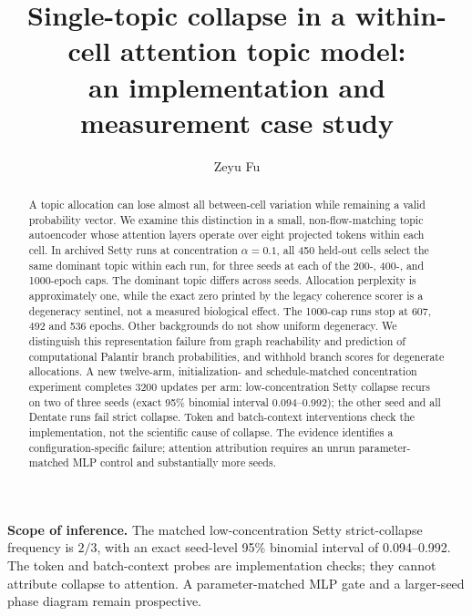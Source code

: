 \documentclass[11pt]{article}
\title{\textbf{Single-topic collapse in a within-cell attention topic model:\\ an implementation and measurement case study}}
\author[1]{Zeyu Fu}
\affil[1]{State Key Laboratory of Trauma and Chemical Poisoning, Institute of Combined Injury,
Chongqing Engineering Research Center for Nanomedicine, College of Preventive Medicine,
Army Medical University, Chongqing, China\\
\texttt{fuzeyu09@gmail.com}}
\date{}
\begin{document}
\maketitle


\begin{abstract}
A topic allocation can lose almost all between-cell variation while remaining a valid probability vector. We examine this distinction in a small, non-flow-matching topic autoencoder whose attention layers operate over eight projected tokens within each cell. In archived Setty runs at concentration $\alpha=0.1$, all 450 held-out cells select the same dominant topic within each run, for three seeds at each of the 200-, 400-, and 1000-epoch caps. The dominant topic differs across seeds. Allocation perplexity is approximately one, while the exact zero printed by the legacy coherence scorer is a degeneracy sentinel, not a measured biological effect. The 1000-cap runs stop at 607, 492 and 536 epochs. Other backgrounds do not show uniform degeneracy. We distinguish this representation failure from graph reachability and prediction of computational Palantir branch probabilities, and withhold branch scores for degenerate allocations. A new twelve-arm, initialization- and schedule-matched concentration experiment completes 3200 updates per arm: low-concentration Setty collapse recurs on two of three seeds (exact 95\% binomial interval 0.094--0.992); the other seed and all Dentate runs fail strict collapse. Token and batch-context interventions check the implementation, not the scientific cause of collapse. The evidence identifies a configuration-specific failure; attention attribution requires an unrun parameter-matched MLP control and substantially more seeds.
\end{abstract}

\noindent\textbf{Scope of inference.} The matched low-concentration Setty strict-collapse frequency is $2/3$, with an exact seed-level 95\% binomial interval of 0.094--0.992. The token and batch-context probes are implementation checks; they cannot attribute collapse to attention. A parameter-matched MLP gate and a larger-seed phase diagram remain prospective.


\end{document}
